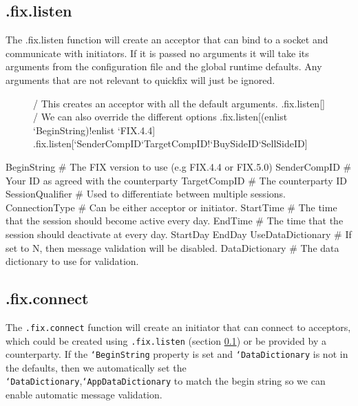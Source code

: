 \subsection{.fix.listen}
\label{func:listen}

The .fix.listen function will create an acceptor that can bind to a socket and communicate with initiators. If it is
passed no arguments it will take its arguments from the configuration file and the global runtime defaults. Any arguments
that are not relevant to quickfix will just be ignored.

\begin{figure}[H]
\begin{qcode}
/ This creates an acceptor with all the default arguments.
.fix.listen[] 
/ We can also override the different options 
.fix.listen[(enlist `BeginString)!enlist `FIX.4.4]
.fix.listen[`SenderCompID`TargetCompID!`BuySideID`SellSideID]
\end{qcode}
\end{figure}

\begin{inicode}
BeginString      # The FIX version to use (e.g FIX.4.4 or FIX.5.0)
SenderCompID     # Your ID as agreed with the counterparty
TargetCompID     # The counterparty ID
SessionQualifier # Used to differentiate between multiple sessions.
ConnectionType   # Can be either acceptor or initiator.
StartTime        # The time that the session should become active every day.
EndTime          # The time that the session should deactivate at every day.
StartDay
EndDay
UseDataDictionary # If set to N, then message validation will be disabled.
DataDictionary    # The data dictionary to use for validation.
\end{inicode}

\subsection{.fix.connect}
\label{func:connect}

The \texttt{.fix.connect} function will create an initiator that can connect to acceptors, which could be created using \texttt{.fix.listen} (section \ref{func:listen}) or be provided by a counterparty. If the \texttt{`BeginString} property is set and \texttt{`DataDictionary}
is not in the defaults, then we automatically set the \texttt{`DataDictionary},\texttt{`AppDataDictionary} to match the begin string so we can enable automatic message validation.

